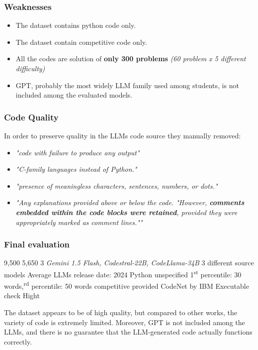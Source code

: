 \subsubsection*{Weaknesses}
\begin{itemize}
    \item The dataset contains python code only.
    \item The dataset contain competitive code only.
    \item All the codes are solution of \textbf{only 300 problems} 
    \textit{(60 problem x 5 different difficulty)}
    \item GPT, probably the most widely LLM family 
    used among students, is not 
    included among the evaluated models.
\end{itemize}


\subsubsection*{Code Quality}
In order to preserve quality in the LLMs code source they manually removed:
\begin{itemize}
    \item \textit{"code with failure to produce any output"}
    \item \textit{"C-family languages instead of Python."}
    \item \textit{"presence of meaningless characters, sentences, numbers, or dots."}
    \item \textit{"Any explanations provided above or below the code.
    "However, \textbf{comments embedded within the code blocks were retained}, provided they were 
    appropriately marked as comment lines.""}
\end{itemize}


\subsubsection*{Final evaluation}


\expandafter\def\csname AIGCodeSetHumanCode\endcsname{9,500}
\expandafter\def\csname AIGCodeSetLLMCode\endcsname{5,650}
\expandafter\def\csname AIGCodeSetNumLLMs\endcsname{3 \textit{Gemini 1.5 Flash, Codestral-22B, CodeLlama-34B}}
\expandafter\def\csname AIGCodeSetLLMDiversity\endcsname{3 different source models}
\expandafter\def\csname AIGCodeSetCurrentUse\endcsname{Average LLMs release date: 2024}
\expandafter\def\csname AIGCodeSetLanguages\endcsname{Python}
\expandafter\def\csname AIGCodeSetCodeTypes\endcsname{unspecified}
\expandafter\def\csname AIGCodeSetCodeSize\endcsname{1\textsuperscript{st} percentile: 30 words,\textsuperscript{rd} percentile: 50 words}
\expandafter\def\csname AIGCodeSetCodeContext\endcsname{competitive}
\expandafter\def\csname AIGCodeSetPrompts\endcsname{provided}
\expandafter\def\csname AIGCodeSetSources\endcsname{CodeNet by IBM \cite{puri2021codenet}}
\expandafter\def\csname AIGCodeSetCodeQuality\endcsname{Executable check}
\expandafter\def\csname AIGCodeSetReliability\endcsname{Hight}




The dataset appears to be of high quality, but compared to other works, 
the variety of code is extremely limited.
Moreover, GPT is not included among the LLMs, and there is no guarantee that 
the LLM-generated code actually functions correctly.